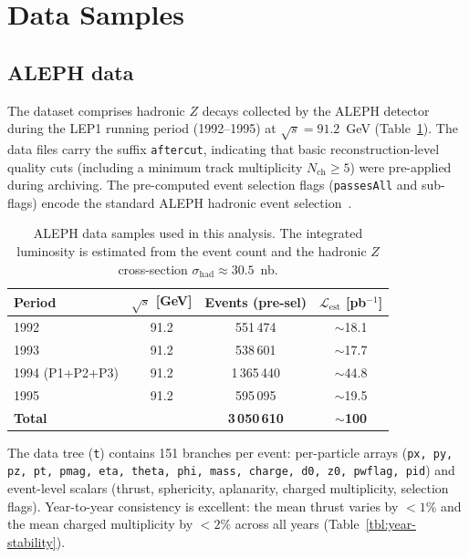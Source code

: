 \documentclass[11pt,a4paper]{article}
\begin{document}
\section{Data Samples}
\label{sec:data}

\subsection{ALEPH data}
\label{sec:data-aleph}

The dataset comprises hadronic $Z$ decays collected by the ALEPH
detector~\cite{ALEPH:1995aqm} during the LEP1 running period
(1992--1995) at $\sqrt{s} = 91.2$~GeV (Table~\ref{tbl:data}).  The data files carry the
suffix \texttt{aftercut}, indicating that basic reconstruction-level
quality cuts (including a minimum track multiplicity $N_\text{ch}
\ge 5$) were pre-applied during archiving.  The pre-computed event
selection flags (\texttt{passesAll} and sub-flags) encode the standard
ALEPH hadronic event selection~\cite{ALEPH:1998vtv,ALEPH:1999rgl}.

\begin{table}[htbp]
\centering
\caption{ALEPH data samples used in this analysis.  The integrated
  luminosity is estimated from the event count and the hadronic
  $Z$ cross-section $\sigma_\text{had} \approx 30.5$~nb.}
\label{tbl:data}
\begin{tabular}{lccc}
\toprule
Period & $\sqrt{s}$ [GeV] & Events (pre-sel) &
  $\mathcal{L}_\text{est}$ [pb$^{-1}$] \\
\midrule
1992 & 91.2 & 551\,474 & $\sim$18.1 \\
1993 & 91.2 & 538\,601 & $\sim$17.7 \\
1994 (P1+P2+P3) & 91.2 & 1\,365\,440 & $\sim$44.8 \\
1995 & 91.2 & 595\,095 & $\sim$19.5 \\
\midrule
\textbf{Total} & & \textbf{3\,050\,610} & $\sim$\textbf{100} \\
\bottomrule
\end{tabular}
\end{table}

The data tree (\texttt{t}) contains 151 branches per event: per-particle
arrays (\texttt{px, py, pz, pt, pmag, eta, theta, phi, mass, charge,
d0, z0, pwflag, pid}) and event-level scalars (thrust, sphericity,
aplanarity, charged multiplicity, selection flags).  Year-to-year
consistency is excellent: the mean thrust varies by $<\!1\%$ and the
mean charged multiplicity by $<\!2\%$ across all years
(Table~\ref{tbl:year-stability}).
\end{document}
